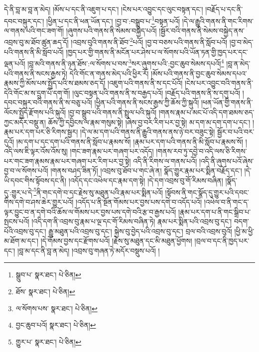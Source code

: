 དེ་ནི་བླ་མ་བླ་ན་མེད། །མོས་པ་དང་ནི་འཇུག་པ་དང་། །ངེས་པར་འབྱུང་དང་ལུང་བསྟན་དང་། །བརྗོད་པ་དང་ནི་དབང་བསྐུར་དང་། །ཕྱིན་པ་དང་ནི་ཕན་ཡོན་དང་། །བྱ་བ་:བསྒྲུབ་པ་\footnote{སྒྲུབ་པ་  སྣར་ཐང་།  པེ་ཅིན། }བསྟན་པའོ། །དེ་ལ་རྒྱུའི་གནས་ནི་གང་རིགས་ལ་གནས་པའི་གང་ཟག་གོ། །ཞུགས་པའི་གནས་ནི་སེམས་བསྐྱེད་པའོ། །སྦྱོར་བའི་གནས་ནི་སེམས་བསྐྱེད་ནས་འབྲས་བུ་མ་ཐོབ་ཚུན་ཆད་དོ། །འབྲས་བུའི་གནས་ནི་ཐོབ་\footnote{ཐོས་  སྣར་ཐང་།  པེ་ཅིན། }པའོ། །བྱ་བ་བཅས་པའི་གནས་ནི་སློབ་པའོ། །བྱ་བ་མེད་པའི་གནས་ནི་མི་སློབ་པའོ། །ཁྱད་པར་གྱི་གནས་ནི་མངོན་པར་ཤེས་པ་ལ་སོགས་པའི་ཡོན་ཏན་གྱི་ཁྱད་པར་དང་ལྡན་པའོ། །བླ་མའི་གནས་ནི་ཉན་ཐོས་:ལ་སོགས་པ་བས་\footnote{ལ་སོགས་པས་  སྣར་ཐང་།  པེ་ཅིན། }སར་ཞུགས་པའི་:བྱང་ཆུབ་སེམས་དཔའོ།\footnote{བྱང་ཆུབ་པའོ།  སྣར་ཐང་།  པེ་ཅིན། } །བླ་ན་མེད་པའི་གནས་ནི་སངས་རྒྱས་ཏེ། དེའི་གོང་ན་གནས་མེད་པའི་ཕྱིར་རོ། །མོས་པའི་གནས་ནི་བྱང་ཆུབ་སེམས་དཔའ་རྣམས་ཀྱི་མོས་པས་སྤྱོད་པའི་ས་ཐམས་ཅད་དོ། །འཇུག་པའི་གནས་ནི་ས་དང་པོའོ། །ངེས་པར་འབྱུང་བའི་གནས་ནི་དེའི་གོང་མ་ས་དྲུག་པོ་དག་གོ། །ལུང་བསྟན་པའི་གནས་ནི་ས་བརྒྱད་པའོ། །བརྗོད་པའི་གནས་ནི་ས་དགུ་པའོ། །དབང་བསྐུར་བའི་གནས་ནི་ས་བཅུ་པའོ། །ཕྱིན་པའི་གནས་ནི་སངས་རྒྱས་ཀྱི་ཆོས་ཀྱི་སྐུའོ། །ཕན་ཡོན་གྱི་གནས་ནི་ལོངས་སྤྱོད་རྫོགས་པའི་སྐུའོ། །བྱ་བ་སྒྲུབ་པའི་གནས་ནི་སྤྲུལ་པའི་སྐུའོ། །གནས་རྣམ་པ་མང་པོ་འདི་དག་ཐམས་ཅད་ཀྱང་མདོར་བསྡུ་ན། ཆོས་ཀྱི་དབྱིངས་ལ་རྣམ་གསུམ་སྟེ། །ཞེས་བྱ་བར་རིག་པར་བྱ་སྟེ། མ་དག་མ་དག་དག་པ་དང་། །རྣམ་པར་དག་པར་ཅི་རིགས་སྦྱར། །དེ་ལ་མ་དག་པའི་གནས་ནི་རྒྱུའི་གནས་ནས་ཉེ་བར་བཟུང་སྟེ། སྦྱོར་བ་པའི་བར་དུའོ། །མ་དག་པ་དང་དག་པའི་གནས་ནི་སློབ་པ་རྣམས་སོ། །རྣམ་པར་དག་པའི་གནས་ནི་མི་སློབ་པ་རྣམས་སོ། །འདི་ལས་ཇི་ལྟར་འོས་འོས་སུ། །གང་ཟག་རྣམ་པར་གཞག་པར་འདོད། །གནས་རབ་ཏུ་དབྱེ་བ་འདི་ལས་ཅི་རིགས་པར་གང་ཟག་རྣམས་རྣམ་པར་གཞག་པར་རིག་པར་བྱ་སྟེ། འདི་ནི་རིགས་ལ་གནས་པའོ། །འདི་ནི་ཞུགས་པའོ་ཞེས་བྱ་བ་ལ་སོགས་པའོ། །གནས་བཤད་ཟིན་ཏོ། །འབྲས་བུ་ཐོབ་པ་གང་ཞེ་ན། སྣོད་གྱུར་རྣམ་པར་སྨིན་བརྗོད་དང་། །དེ་ཡི་དབང་གིས་སྟོབས་དང་ནི། །འདོད་དང་འཕེལ་དང་རྣམ་དག་སྟེ། །དེ་དག་འབྲས་བུ་གོ་རིམས་བཞིན། །སྣོད་དུ་:གྱུར་པ་དེ་\footnote{གྱུར་པ་  སྣར་ཐང་།  པེ་ཅིན། }ནི་གང་དགེ་བ་དང་རྗེས་སུ་མཐུན་པའི་རྣམ་པར་སྨིན་པའོ། །སྟོབས་ནི་གང་སྣོད་དུ་གྱུར་པའི་དབང་གིས་དགེ་བ་ཤས་ཆེར་གྱུར་པའོ། །འདོད་པ་ནི་སྔོན་གོམས་པར་བྱས་པས་དགེ་བ་འདོད་པའོ། །འཕེལ་བ་ནི་གང་ད་ལྟར་བྱུང་བ་ན་དགེ་བའི་ཆོས་ལ་གོམས་པར་བྱས་པས་དགེ་བའི་རྩ་བ་རྒྱས་པའོ། །རྣམ་པར་དག་པ་ནི་གང་སྒྲིབ་པ་སྤངས་པའོ། །འདི་དག་ནི་འབྲས་བུ་རྣམ་པ་ལྔ་དང་གོ་རིམས་བཞིན་ཏེ། རྣམ་པར་སྨིན་པའི་འབྲས་བུ་དང་། བདག་པོའི་འབྲས་བུ་དང་། རྒྱུ་མཐུན་པའི་འབྲས་བུ་དང་། སྐྱེས་བུ་བྱེད་པའི་འབྲས་བུ་དང་། བྲལ་བའི་འབྲས་བུའོ། །ཕྱི་མ་ཕྱི་མ་ཐོག་མ་དང་། །དེ་གོམས་བྱས་དང་རྫོགས་པའོ། །རྗེས་སུ་མཐུན་དང་མི་མཐུན་ཕྱོགས། །བྲལ་བ་དང་ནི་ཁྱད་པར་དང་། །བླ་མ་དང་ནི་བླ་ན་མེད། །འབྲས་བུ་གཞན་ཏེ་མདོར་བསྡུས་པའོ། །
